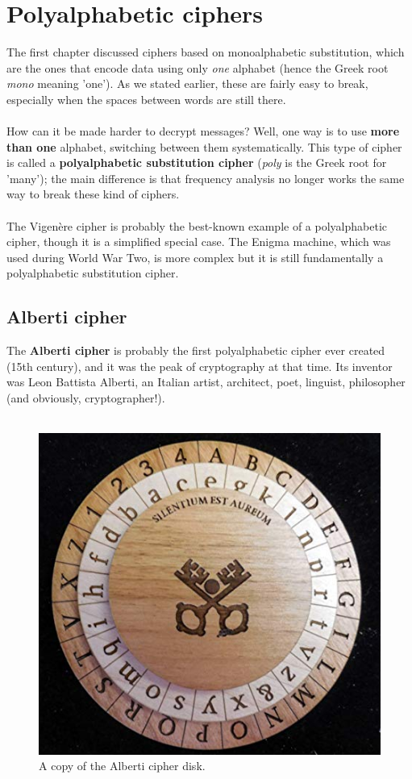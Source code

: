 \documentclass[Lau,binding=0.6cm,oneside]{sapthesis}
\begin{document}
\chapter{Polyalphabetic ciphers}
The first chapter discussed ciphers based on monoalphabetic substitution, which are the ones that encode data using only \textit{one} alphabet (hence the Greek root \textit{mono} meaning 'one'). As we stated earlier, these are fairly easy to break, especially when the spaces between words are still there.\\\\
How can it be made harder to decrypt messages? Well, one way is to use \textbf{more than one} alphabet, switching between them systematically. This type of cipher is called a \textbf{polyalphabetic substitution cipher} (\textit{poly} is the Greek root for 'many'); the main difference is that frequency analysis no longer works the same way to break these kind of ciphers.\\\\
The Vigenère cipher is probably the best-known example of a polyalphabetic cipher, though it is a simplified special case. The Enigma machine, which was used during World War Two, is more complex but it is still fundamentally a polyalphabetic substitution cipher.

\section{Alberti cipher}
The \textbf{Alberti cipher} is probably the first polyalphabetic cipher ever created (15th century), and it was the peak of cryptography at that time. Its inventor was Leon Battista Alberti, an Italian artist, architect, poet, linguist, philosopher (and obviously, cryptographer!).\\\\

\begin{figure}[H]
\includegraphics[scale=0.5]{alberti_cipher_disk}
\centering
\caption{A copy of the Alberti cipher disk.}
\centering
\end{figure}
\end{document}
